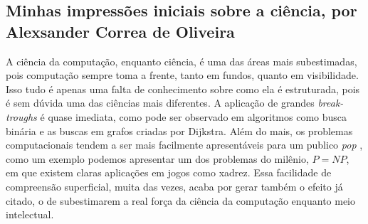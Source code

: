 \subsection{Minhas impressões iniciais sobre a ciência, por Alexsander Correa de Oliveira}

A ciência da computação, enquanto ciência, é uma das áreas mais subestimadas, pois computação sempre toma a frente, tanto em fundos, quanto em visibilidade. Isso tudo é apenas uma falta de conhecimento sobre como ela é estruturada, pois é sem dúvida uma das ciências mais diferentes. A aplicação de grandes \emph{break-troughs} é quase imediata, como pode ser observado em algoritmos como busca binária e as buscas em grafos criadas por Dijkstra. 
Além do mais, os problemas computacionais tendem a ser mais facilmente apresentáveis para um publico \emph{pop} \citep{wikipedia_scientific_2021}, como um exemplo podemos apresentar um dos problemas do milênio, $P = NP$, em que existem claras aplicações em jogos como xadrez. Essa facilidade de compreensão superficial, muita das vezes, acaba por gerar também o efeito já citado, o de subestimarem a real força da ciência da computação enquanto meio intelectual. 

